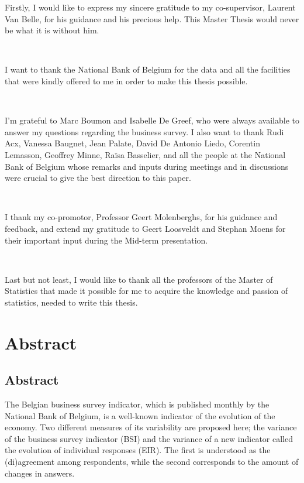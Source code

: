 \documentclass[12pt,a4paper,oneside]{book}
\begin{document}
Firstly, I would like to express my sincere gratitude to my co-supervisor, Laurent Van Belle, for his guidance and his precious help. This Master Thesis would never be what it is without him. 

\ 

I want to thank the National Bank of Belgium for the data and all the facilities that were kindly offered to me in order to make this thesis possible.

\

I'm grateful to Marc Boumon and Isabelle De Greef, who were always available to answer my questions regarding the business survey. 
I also want to thank Rudi Acx, 
Vanessa Baugnet, 
Jean Palate, 
David De Antonio Liedo, 
Corentin Lemasson,
Geoffrey Minne,
Raïsa Basselier,
and all the people at the National Bank of Belgium whose remarks and inputs during meetings and in discussions were crucial to give the best direction to this paper. 

\

I thank my co-promotor, Professor Geert Molenberghs, for his guidance and feedback, and extend my gratitude to Geert Loosveldt and Stephan Moens for their important input during the Mid-term presentation.

\

Last but not least, I would like to thank all the professors of the Master of Statistics that made it possible for me to acquire the knowledge and passion of statistics, needed to write this thesis. 


\chapter*{Abstract}



\section*{Abstract}

The Belgian business survey indicator, which is published monthly by the National Bank of Belgium, is a well-known indicator of the evolution of the economy.
Two different measures of its variability are proposed here; the variance of the business survey indicator (BSI) and the variance of a new indicator called the evolution of individual responses (EIR).
The first is understood as the (di)agreement among respondents, while the second corresponds to the amount of changes in answers.

\end{document}
